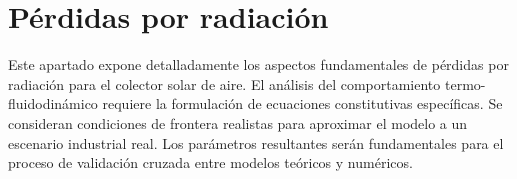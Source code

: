 \section{Pérdidas por radiación}
\label{sec:cap06_radiacion}

Este apartado expone detalladamente los aspectos fundamentales de pérdidas por radiación para el colector solar de aire.
El análisis del comportamiento termo-fluidodinámico requiere la formulación de ecuaciones constitutivas específicas.
Se consideran condiciones de frontera realistas para aproximar el modelo a un escenario industrial real.
Los parámetros resultantes serán fundamentales para el proceso de validación cruzada entre modelos teóricos y numéricos.
